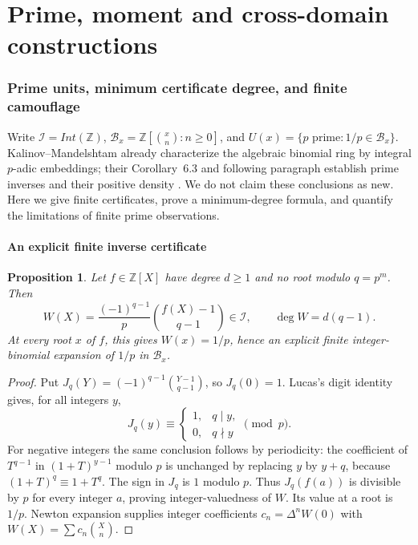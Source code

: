 \documentclass[11pt,a4paper]{article}
\newcommand{\Z}{\mathbb Z}
\newtheorem{proposition}[theorem]{Proposition}
\theoremstyle{definition}
\theoremstyle{remark}
\theoremstyle{plain}
\numberwithin{equation}{section}
\def\operatorname#1{#1}\def\mathrm#1{#1}}
\begin{document}

\clearpage
\part{Prime, moment and cross-domain constructions}


\section{Prime units, minimum certificate degree, and finite camouflage}
\label{em:pu:section}

Write $\mathcal I=\operatorname{Int}(\Z)$,
$\mathcal B_x=\Z[\binom xn:n\ge0]$, and
$U(x)=\{p\text{ prime}:1/p\in\mathcal B_x\}$.
Kalinov--Mandelshtam already characterize the algebraic binomial ring
by integral $p$-adic embeddings; their Corollary~6.3 and following
paragraph establish prime inverses and their positive density
\cite{KM}.  We do not claim these conclusions as new.  Here we give
finite certificates, prove a minimum-degree formula, and quantify
the limitations of finite prime observations.

\subsection{An explicit finite inverse certificate}

\begin{proposition}\label{em:pu:prop:certificate}
Let $f\in\Z[X]$ have degree $d\ge1$ and no root modulo $q=p^m$.
Then
\[
 W(X)=\frac{(-1)^{q-1}}p\binom{f(X)-1}{q-1}\in\mathcal I,
 \qquad \deg W=d(q-1).
\]
At every root $x$ of $f$, this gives $W(x)=1/p$, hence an explicit
finite integer-binomial expansion of $1/p$ in $\mathcal B_x$.
\end{proposition}
\begin{proof}
Put $J_q(Y)=(-1)^{q-1}\binom{Y-1}{q-1}$, so $J_q(0)=1$.
Lucas's digit identity gives, for all integers $y$,
\[
 J_q(y)\equiv\begin{cases}1,&q\mid y,\\0,&q\nmid y\end{cases}
 \pmod p.
\]
For negative integers the same conclusion follows by periodicity:
the coefficient of $T^{q-1}$ in $(1+T)^{y-1}$ modulo $p$ is
unchanged by replacing $y$ by $y+q$, because
$(1+T)^q\equiv1+T^q$.  The sign in $J_q$ is $1$ modulo $p$.
Thus $J_q(f(a))$ is divisible by $p$ for every integer $a$,
proving integer-valuedness of $W$.  Its value at a root is $1/p$.
Newton expansion supplies integer coefficients
$c_n=\Delta^nW(0)$ with $W(X)=\sum c_n\binom Xn$.
\end{proof}
\end{document}
